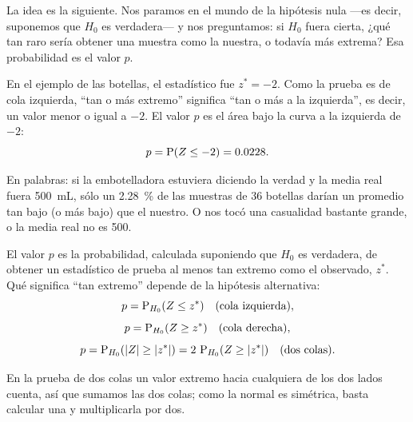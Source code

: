 La idea es la siguiente. Nos paramos en el mundo de la hipótesis nula —es decir, suponemos que \(H_0\) es verdadera— y nos preguntamos: si \(H_0\) fuera cierta, ¿qué tan raro sería obtener una muestra como la nuestra, o todavía más extrema? Esa probabilidad es el valor \(p\).

En el ejemplo de las botellas, el estadístico fue \({z^*=-2}\). Como la prueba es de cola izquierda, \enquote{tan o más extremo} significa \enquote{tan o más a la izquierda}, es decir, un valor menor o igual a \(-2\). El valor \(p\) es el área bajo la curva a la izquierda de \(-2\):
\[p = \operatorname{P}(Z \leq -2) = \num{0,0228}.\]


En palabras: si la embotelladora estuviera diciendo la verdad y la media real fuera \qty{500}{\milli\liter}, sólo un \qty{2,28}{\percent} de las muestras de \num{36} botellas darían un promedio tan bajo (o más bajo) que el nuestro. O nos tocó una casualidad bastante grande, o la media real no es \num{500}.

\formal
El valor \(p\) es la probabilidad, calculada suponiendo que \(H_0\) es verdadera, de obtener un estadístico de prueba al menos tan extremo como el observado, \(z^*\). Qué significa \enquote{tan extremo} depende de la hipótesis alternativa:
\[p = \operatorname{P}_{H_0}(Z \leq z^*) \quad(\text{cola izquierda}),\]
\[p = \operatorname{P}_{H_0}(Z \geq z^*) \quad(\text{cola derecha}),\]
\[p = \operatorname{P}_{H_0}(|Z| \geq |z^*|) = 2\,\operatorname{P}_{H_0}(Z \geq |z^*|) \quad(\text{dos colas}).\]

\informal
En la prueba de dos colas un valor extremo hacia cualquiera de los dos lados cuenta, así que sumamos las dos colas; como la normal es simétrica, basta calcular una y multiplicarla por dos.


